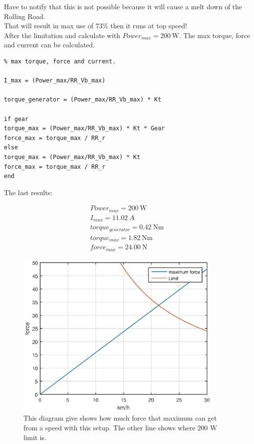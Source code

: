 Have to notify that this is not possible because it will cause a melt down of the Rolling Road.\\
That will result in max use of $ 73 \% $ then it runs at top speed!\\

After the limitation and calculate with $ Power_{max} = \SI{200}{\watt} $. The max torque, force and current can be calculated.

\lstset{language=MATLAB}
\begin{lstlisting}
% max torque, force and current.

I_max = (Power_max/RR_Vb_max)

torque_generator = (Power_max/RR_Vb_max) * Kt

if gear
torque_max = (Power_max/RR_Vb_max) * Kt * Gear
force_max = torque_max / RR_r
else
torque_max = (Power_max/RR_Vb_max) * Kt
force_max = torque_max / RR_r
end
\end{lstlisting}

The last results:

\begin{equation}
\begin{split}
Power_{max} = \SI{200}{\watt}\\
I_{max} = \SI{11.02}{A}\\
torque_{generator} = \SI{0.42}{\newton \metre}\\
torque_{max} = \SI{1.82}{\newton \metre}\\
force_{max} = \SI{24.00}{\newton}
\end{split}
\end{equation}

\begin{figure}[H]
	\centering
	\includegraphics [width=4in]{Hardware/Pictures/force.eps}
	\caption{This diagram give shows how much force that maximum can get from a speed with this setup. The other line shows where 200 W limit is.}
	\label{fig:Force_and_speed}
\end{figure}